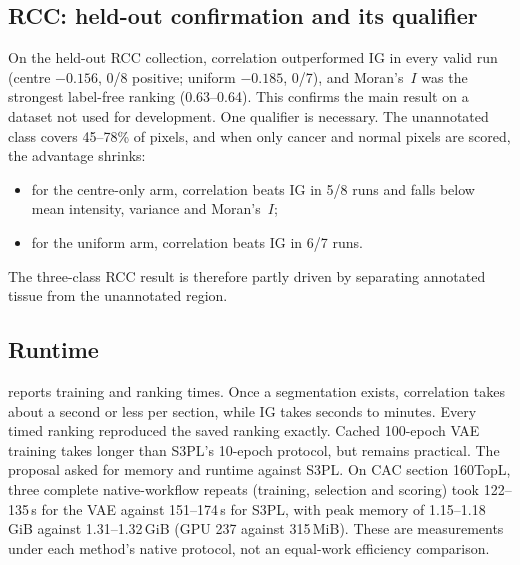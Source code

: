 \subsection{RCC: held-out confirmation and its qualifier}
\label{sec:res-rcc}
On the held-out RCC collection, correlation outperformed IG in every valid run
(centre $-0.156$, 0/8 positive; uniform $-0.185$, 0/7), and Moran's~$I$ was
the strongest label-free ranking (0.63--0.64). This confirms the main result
on a dataset not used for development. One qualifier is necessary. The
unannotated class covers 45--78\% of pixels, and when only cancer and normal
pixels are scored, the advantage shrinks:
\begin{itemize}
  \item for the centre-only arm, correlation beats IG in 5/8 runs and falls
        below mean intensity, variance and Moran's~$I$;
  \item for the uniform arm, correlation beats IG in 6/7 runs.
\end{itemize}
The three-class RCC result is therefore partly driven by separating annotated
tissue from the unannotated region.

\subsection{Runtime}
\label{sec:res-runtime}
 reports training and ranking times. Once a segmentation
exists, correlation takes about a second or less per section, while IG takes
seconds to minutes. Every timed ranking reproduced the saved ranking exactly.
Cached 100-epoch VAE training takes longer than S3PL's 10-epoch protocol, but
remains practical. The proposal asked for memory and runtime against S3PL. On
CAC section 160TopL, three complete native-workflow repeats (training,
selection and scoring) took 122--135\,s for the VAE against 151--174\,s for
S3PL, with peak memory of 1.15--1.18\,GiB against 1.31--1.32\,GiB (GPU
237 against 315\,MiB). These are measurements under each method's native protocol,
not an equal-work efficiency comparison.


